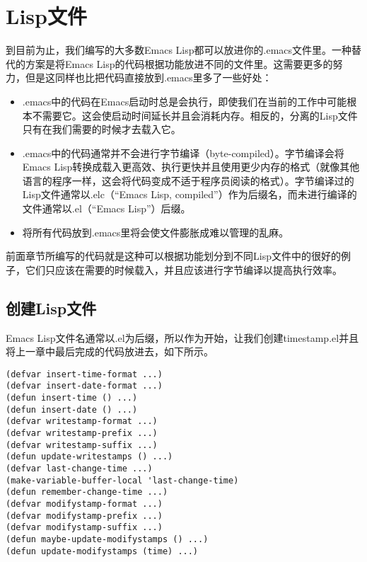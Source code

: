 \chapter{Lisp文件}
\label{chapter:05-Lisp-Files}


到目前为止，我们编写的大多数Emacs Lisp都可以放进你的.emacs文件里。一种替代的方案是将Emacs Lisp的代码根据功能放进不同的文件里。这需要更多的努力，但是这同样也比把代码直接放到.emacs里多了一些好处：

\begin{itemize}
  \item .emacs中的代码在Emacs启动时总是会执行，即使我们在当前的工作中可能根本不需要它。这会使启动时间延长并且会消耗内存。相反的，分离的Lisp文件只有在我们需要的时候才去载入它。
  \item .emacs中的代码通常并不会进行字节编译（byte-compiled）。字节编译会将Emacs Lisp转换成载入更高效、执行更快并且使用更少内存的格式（就像其他语言的程序一样，这会将代码变成不适于程序员阅读的格式）。字节编译过的Lisp文件通常以.elc（“Emacs Lisp, compiled”）作为后缀名，而未进行编译的文件通常以.el（“Emacs Lisp”）后缀。
  \item 将所有代码放到.emacs里将会使文件膨胀成难以管理的乱麻。
\end{itemize}

前面章节所编写的代码就是这种可以根据功能划分到不同Lisp文件中的很好的例子，它们只应该在需要的时候载入，并且应该进行字节编译以提高执行效率。

\section{创建Lisp文件}
\label{section:05-Creating-a-Lisp-File}

Emacs Lisp文件名通常以.el为后缀，所以作为开始，让我们创建timestamp.el并且将上一章中最后完成的代码放进去，如下所示。

\begin{verbatim}
(defvar insert-time-format ...)
(defvar insert-date-format ...)
(defun insert-time () ...)
(defun insert-date () ...)
(defvar writestamp-format ...)
(defvar writestamp-prefix ...)
(defvar writestamp-suffix ...)
(defun update-writestamps () ...)
(defvar last-change-time ...)
(make-variable-buffer-local 'last-change-time)
(defun remember-change-time ...)
(defvar modifystamp-format ...)
(defvar modifystamp-prefix ...)
(defvar modifystamp-suffix ...)
(defun maybe-update-modifystamps () ...)
(defun update-modifystamps (time) ...)
\end{verbatim}

